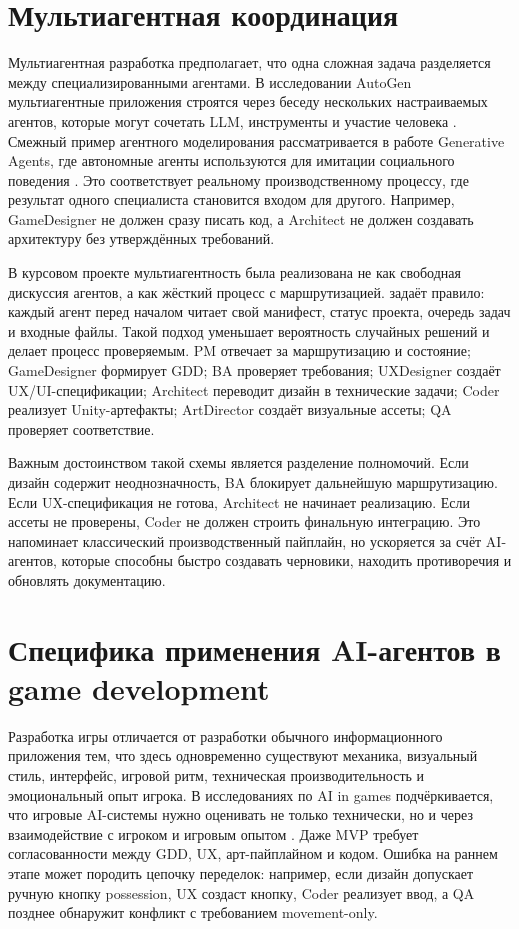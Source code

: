 \documentclass[a4paper,12pt]{report}
\newcommand{\file}[1]{\path{#1}}
\begin{document}
\section{Мультиагентная координация}

Мультиагентная разработка предполагает, что одна сложная задача разделяется между специализированными агентами. В исследовании AutoGen мультиагентные приложения строятся через беседу нескольких настраиваемых агентов, которые могут сочетать LLM, инструменты и участие человека \cite{autogen}. Смежный пример агентного моделирования рассматривается в работе Generative Agents, где автономные агенты используются для имитации социального поведения \cite{generative-agents}. Это соответствует реальному производственному процессу, где результат одного специалиста становится входом для другого. Например, GameDesigner не должен сразу писать код, а Architect не должен создавать архитектуру без утверждённых требований.

В курсовом проекте мультиагентность была реализована не как свободная дискуссия агентов, а как жёсткий процесс с маршрутизацией. \file{AGENTS.md} задаёт правило: каждый агент перед началом читает свой манифест, статус проекта, очередь задач и входные файлы. Такой подход уменьшает вероятность случайных решений и делает процесс проверяемым. PM отвечает за маршрутизацию и состояние; GameDesigner формирует GDD; BA проверяет требования; UXDesigner создаёт UX/UI-спецификации; Architect переводит дизайн в технические задачи; Coder реализует Unity-артефакты; ArtDirector создаёт визуальные ассеты; QA проверяет соответствие.

Важным достоинством такой схемы является разделение полномочий. Если дизайн содержит неоднозначность, BA блокирует дальнейшую маршрутизацию. Если UX-спецификация не готова, Architect не начинает реализацию. Если ассеты не проверены, Coder не должен строить финальную интеграцию. Это напоминает классический производственный пайплайн, но ускоряется за счёт AI-агентов, которые способны быстро создавать черновики, находить противоречия и обновлять документацию.

\section{Специфика применения AI-агентов в game development}

Разработка игры отличается от разработки обычного информационного приложения тем, что здесь одновременно существуют механика, визуальный стиль, интерфейс, игровой ритм, техническая производительность и эмоциональный опыт игрока. В исследованиях по AI in games подчёркивается, что игровые AI-системы нужно оценивать не только технически, но и через взаимодействие с игроком и игровым опытом \cite{ai-and-games}. Даже MVP требует согласованности между GDD, UX, арт-пайплайном и кодом. Ошибка на раннем этапе может породить цепочку переделок: например, если дизайн допускает ручную кнопку possession, UX создаст кнопку, Coder реализует ввод, а QA позднее обнаружит конфликт с требованием movement-only.
\end{document}
